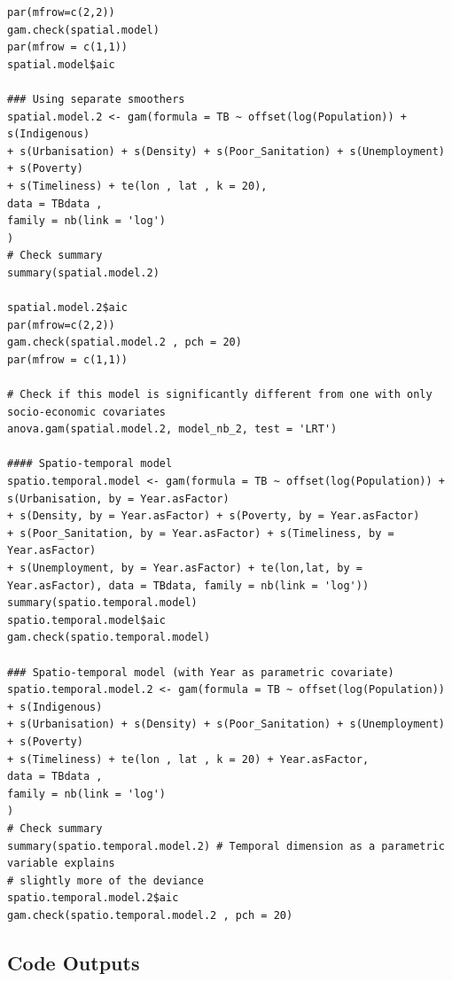 \begin{verbatim}
par(mfrow=c(2,2))
gam.check(spatial.model)
par(mfrow = c(1,1))
spatial.model$aic

### Using separate smoothers
spatial.model.2 <- gam(formula = TB ~ offset(log(Population)) + s(Indigenous) 
+ s(Urbanisation) + s(Density) + s(Poor_Sanitation) + s(Unemployment) + s(Poverty)
+ s(Timeliness) + te(lon , lat , k = 20),
data = TBdata , 
family = nb(link = 'log')
)
# Check summary
summary(spatial.model.2)

spatial.model.2$aic
par(mfrow=c(2,2))
gam.check(spatial.model.2 , pch = 20)
par(mfrow = c(1,1))

# Check if this model is significantly different from one with only socio-economic covariates
anova.gam(spatial.model.2, model_nb_2, test = 'LRT')

#### Spatio-temporal model
spatio.temporal.model <- gam(formula = TB ~ offset(log(Population)) + s(Urbanisation, by = Year.asFactor) 
+ s(Density, by = Year.asFactor) + s(Poverty, by = Year.asFactor) 
+ s(Poor_Sanitation, by = Year.asFactor) + s(Timeliness, by = Year.asFactor) 
+ s(Unemployment, by = Year.asFactor) + te(lon,lat, by = Year.asFactor), data = TBdata, family = nb(link = 'log'))
summary(spatio.temporal.model)
spatio.temporal.model$aic
gam.check(spatio.temporal.model)

### Spatio-temporal model (with Year as parametric covariate)
spatio.temporal.model.2 <- gam(formula = TB ~ offset(log(Population)) + s(Indigenous) 
+ s(Urbanisation) + s(Density) + s(Poor_Sanitation) + s(Unemployment) + s(Poverty)
+ s(Timeliness) + te(lon , lat , k = 20) + Year.asFactor,
data = TBdata , 
family = nb(link = 'log')
)
# Check summary
summary(spatio.temporal.model.2) # Temporal dimension as a parametric variable explains 
# slightly more of the deviance
spatio.temporal.model.2$aic
gam.check(spatio.temporal.model.2 , pch = 20)

\end{verbatim}


\subsection{Code Outputs}
\begin{verbatim}

\end{verbatim}